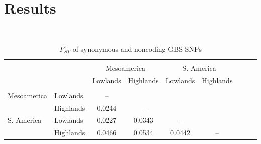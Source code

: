 \section*{Results}

\renewcommand{\arraystretch}{1.1}
\begin{table}[tb]

\begin{center}
 \caption[]{$F_{ST}$ of synonymous and noncoding GBS SNPs}
  \textbf{}\\[-2mm]
{\fontsize{7}{9}\sf
    \begin{tabular}{llccccccl}
    \hline
    & & \\[-3mm]
	&		&	\multicolumn{2}{c}{Mesoamerica}		&	\multicolumn{2}{c}{S. America}		\\
	&		&	Lowlands	&	Highlands	&	Lowlands	&	Highlands	\\
      \hline
    & & \\[-3mm]
Mesoamerica	&	Lowlands	&	--		&			&			&		\\
		&	Highlands	&	0.0244	&	--		&			&		\\
S. America		&	Lowlands	&	0.0227	&	0.0343	&	--		&		\\
		&	Highlands	&	0.0466	&	0.0534	&	0.0442	&	--	\\ [1mm]
    \hline
    \end{tabular}
    \label{FstP}  %
}
\end{center}
\end{table}
\renewcommand{\arraystretch}{1}

